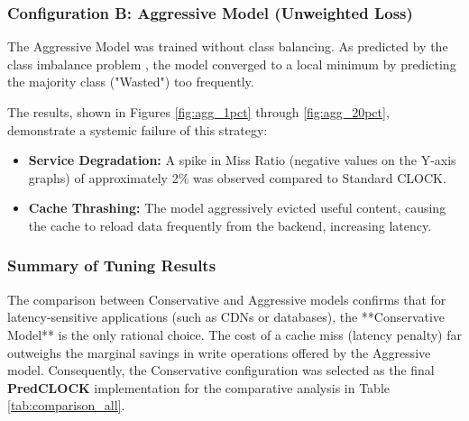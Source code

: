 \subsubsection{Configuration B: Aggressive Model (Unweighted Loss)}
The Aggressive Model was trained without class balancing. As
predicted by the class imbalance problem
\cite{Cunningham2008Supervised}, the model converged to a local
minimum by predicting the majority class ("Wasted") too frequently.

The results, shown in Figures \ref{fig:agg_1pct} through
\ref{fig:agg_20pct}, demonstrate a systemic failure of this strategy:
\begin{itemize}
  \item \textbf{Service Degradation:} A spike in Miss Ratio (negative
    values on the Y-axis graphs) of approximately 2\% was observed
    compared to Standard CLOCK.
  \item \textbf{Cache Thrashing:} The model aggressively evicted
    useful content, causing the cache to reload data frequently from
    the backend, increasing latency.
\end{itemize}

\subsubsection{Summary of Tuning Results}
The comparison between Conservative and Aggressive models confirms
that for latency-sensitive applications (such as CDNs or databases),
the **Conservative Model** is the only rational choice. The cost of a
cache miss (latency penalty) far outweighs the marginal savings in
write operations offered by the Aggressive model. Consequently, the
Conservative configuration was selected as the final
\textbf{PredCLOCK} implementation for the comparative analysis in
Table \ref{tab:comparison_all}.
